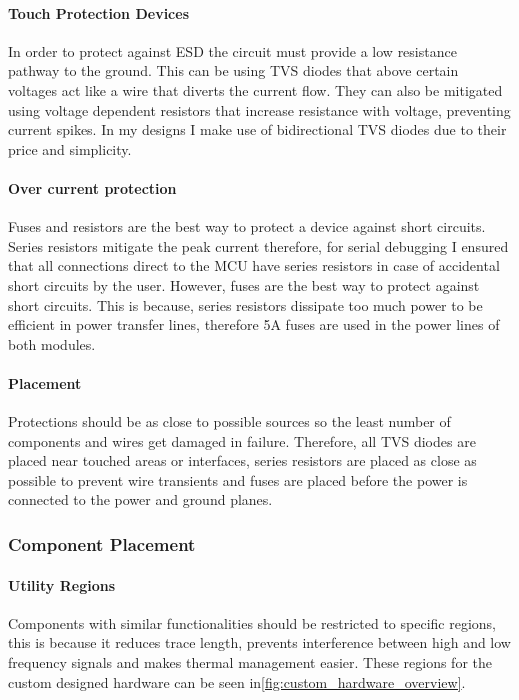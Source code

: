 \paragraph{Touch Protection Devices}
In order to protect against \gls{ESD} the circuit must provide a low resistance pathway to the ground. This can be using \gls{TVS} diodes that above certain voltages act like a wire that diverts the current flow. They can also be mitigated using voltage dependent resistors that increase resistance with voltage, preventing current spikes. In my designs I make use of bidirectional \gls{TVS} diodes due to their price and simplicity. 
\paragraph{Over current protection}
Fuses and resistors are the best way to protect a device against short circuits. Series resistors mitigate the peak current therefore, for serial debugging I ensured that all connections direct to the \gls{MCU} have series resistors in case of accidental short circuits by the user. However, fuses are the best way to protect against short circuits. This is because, series resistors dissipate too much power to be efficient in power transfer lines, therefore 5A fuses are used in the power lines of both modules. 
\paragraph{Placement}
Protections should be as close to possible sources so the least number of components and wires get damaged in failure. Therefore, all \gls{TVS} diodes are placed near touched areas or interfaces, series resistors are placed as close as possible to prevent wire transients and fuses are placed before the power is connected to the power and ground planes.

\subsubsection{Component Placement}
\paragraph{Utility Regions}
Components with similar functionalities should be restricted to specific regions, this is because it reduces trace length, prevents interference between high and low frequency signals and makes thermal management easier. These regions for the custom designed hardware can be seen in\ref{fig:custom_hardware_overview}.
